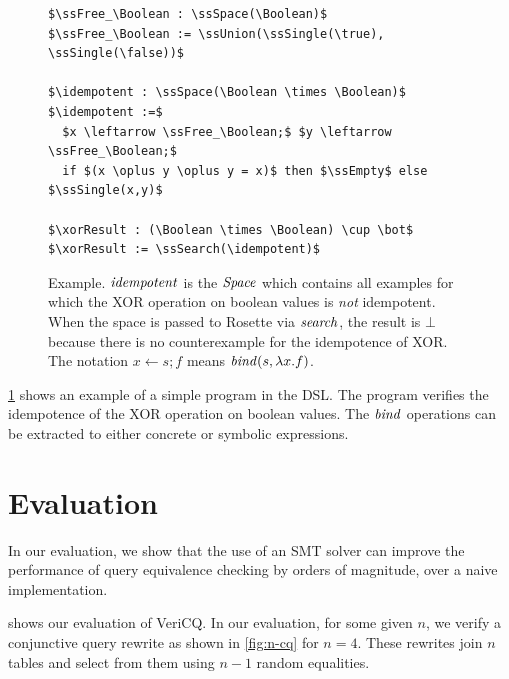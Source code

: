 \begin{figure}
\begin{lstlisting}
$\ssFree_\Boolean : \ssSpace(\Boolean)$
$\ssFree_\Boolean := \ssUnion(\ssSingle(\true), \ssSingle(\false))$

$\idempotent : \ssSpace(\Boolean \times \Boolean)$
$\idempotent :=$
  $x \leftarrow \ssFree_\Boolean;$ $y \leftarrow \ssFree_\Boolean;$
  if $(x \oplus y \oplus y = x)$ then $\ssEmpty$ else $\ssSingle(x,y)$

$\xorResult : (\Boolean \times \Boolean) \cup \bot$
$\xorResult := \ssSearch(\idempotent)$
\end{lstlisting}
\caption{
\SpaceSearch Example. $\mathit{idempotent}$ is the $\mathit{Space}$ which contains all examples for
which the XOR operation on boolean values is \emph{not} idempotent. When the space is
passed to Rosette via $\mathit{search}$, the result is $\bot$ because there is no
counterexample for the idempotence of XOR. The notation $x \leftarrow s; f$
means $\mathit{bind}(s,\lambda x. f)$.
}
\label{fig:rosette-example}
\end{figure}

\cref{fig:rosette-example} shows an example of a simple program in the \SpaceSearch DSL. The program verifies the idempotence of
the XOR operation on boolean values. The $\mathit{bind}$ operations can be extracted 
to either concrete or symbolic expressions.




\section{Evaluation}

In our evaluation, we show that the use of an SMT
solver can improve the performance of query equivalence checking by
orders of magnitude, over a naive implementation. 

 shows our evaluation of VeriCQ. In our evaluation,
for some given $n$, we verify a conjunctive query rewrite as 
shown in \cref{fig:n-cq} for $n = 4$. These rewrites join $n$
tables and select from them using $n - 1$ random equalities.

